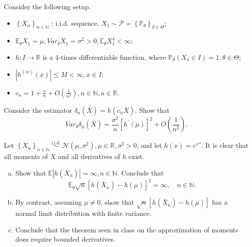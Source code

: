 \begin{ex}
    Consider the following setup. 
    \begin{itemize}
        \item \(\left\{X_{n}\right\}_{n \in \mathbb{N}}\) : i.i.d. sequence, \(X_{1} \sim \mathcal{P}=\left\{\mathbb{P}_{\theta}\right\}_{\theta \in \Theta}\); 
        \item \(\mathbb{E}_{\theta} X_{1}=\mu, Var_{\theta} X_{1}=\sigma^{2}>0, \mathbb{E}_{\theta} X_{1}^{4}<\infty\); 
        \item \(h: I \rightarrow \mathbb{R}\) is a 4-times differentiable function, where \(\mathbb{P}_{\theta}\left(X_{1} \in I\right)=1, \theta \in \Theta\); 
        \item \(\left|h^{(i v)}(x)\right| \leq M<\infty, x \in I\); 
        \item \(c_{n}=1+\frac{a}{n}+O\left(\frac{1}{n^{2}}\right), n \in \mathbb{N}, a \in \mathbb{R}\). 
    \end{itemize}
    Consider the estimator \(\delta_{n}(\bar{X})=h\left(c_{n} \bar{X}\right)\). Show that
    \[
        Var_{\theta} \delta_{n}(\bar{X})=\frac{\sigma^{2}}{n}\left[h^{\prime}(\mu)\right]^{2}+O\left(\frac{1}{n^{2}}\right) .
    \]
\end{ex}



\begin{ex}
    Let \(\left\{X_{n}\right\}_{n \in \mathbb{N}} \stackrel{\text { i.i.d. }}{\sim} \mathcal{N}\left(\mu, \sigma^{2}\right), \mu \in \mathbb{R}, \sigma^{2}>0\), and let \(h(x)=e^{x^{4}}\). It is clear that all moments of \(X\) and all derivatives of \(h\) exist. 
    \begin{enumerate}[(a)]
        \item Show that \(\mathbb{E}\left|h\left(\bar{X}_{n}\right)\right|=\infty, n \in \mathbb{N}\). Conclude that
        \[
            \mathbb{E}_{\theta} \sqrt{n}\left[h\left(\bar{X}_{n}\right)-h(\mu)\right]^{2}=\infty, \quad n \in \mathbb{N} .
        \]
        \item By contrast, assuming \(\mu \neq 0\), show that \(\sqrt{n}\left[h\left(\bar{X}_{n}\right)-h(\mu)\right]\) has a normal limit distribution with finite variance. 
        \item Conclude that the theorem seen in class on the approximation of moments does require bounded derivatives. 
    \end{enumerate}
\end{ex}

